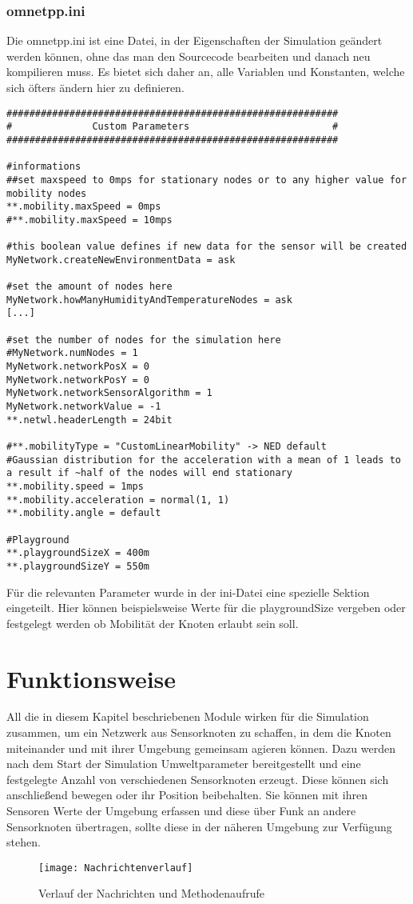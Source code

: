 \subsubsection{omnetpp.ini}

Die omnetpp.ini ist eine Datei, in der Eigenschaften der Simulation geändert werden können, ohne das man den Sourcecode bearbeiten und danach neu kompilieren muss. Es bietet sich daher an, alle Variablen und Konstanten, welche sich öfters ändern hier zu definieren.\newline

\begin{lstlisting}
##########################################################
#    		   Custom Parameters	                     #
##########################################################

#informations
##set maxspeed to 0mps for stationary nodes or to any higher value for mobility nodes
**.mobility.maxSpeed = 0mps
#**.mobility.maxSpeed = 10mps

#this boolean value defines if new data for the sensor will be created
MyNetwork.createNewEnvironmentData = ask

#set the amount of nodes here
MyNetwork.howManyHumidityAndTemperatureNodes = ask
[...]

#set the number of nodes for the simulation here
#MyNetwork.numNodes = 1
MyNetwork.networkPosX = 0
MyNetwork.networkPosY = 0
MyNetwork.networkSensorAlgorithm = 1
MyNetwork.networkValue = -1
**.netwl.headerLength = 24bit

#**.mobilityType = "CustomLinearMobility" -> NED default
#Gaussian distribution for the acceleration with a mean of 1 leads to a result if ~half of the nodes will end stationary
**.mobility.speed = 1mps
**.mobility.acceleration = normal(1, 1)
**.mobility.angle = default

#Playground
**.playgroundSizeX = 400m
**.playgroundSizeY = 550m
\end{lstlisting}

Für die relevanten Parameter wurde in der ini-Datei eine spezielle Sektion eingeteilt. Hier können beispielsweise Werte für die playgroundSize vergeben oder festgelegt werden ob Mobilität der Knoten erlaubt sein soll.

\section{Funktionsweise}

All die in diesem Kapitel beschriebenen Module wirken für die Simulation zusammen, um ein Netzwerk aus Sensorknoten zu schaffen, in dem die Knoten miteinander und mit ihrer Umgebung gemeinsam agieren können. Dazu werden nach dem Start der Simulation Umweltparameter bereitgestellt und eine festgelegte Anzahl von verschiedenen Sensorknoten erzeugt. Diese können sich anschließend bewegen oder ihr Position beibehalten. Sie können mit ihren Sensoren Werte der Umgebung erfassen und diese über Funk an andere Sensorknoten übertragen, sollte diese in der näheren Umgebung zur Verfügung stehen.

\begin{figure}[htbp]
\centering
\caption{Verlauf der Nachrichten und Methodenaufrufe}
\texttt{[image: Nachrichtenverlauf]}
\end{figure}